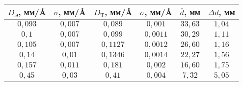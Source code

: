 \begin{tabular}{| c | c | c | c | c | c |}
\hline
$D_{\text{Э}}$, мм/\AA & $\sigma$, мм/\AA & $D_{\text{T}}$, мм/\AA & $\sigma$, мм/\AA & $\overline{d}$, мм & $\Delta d$, мм\\
\hline
$0,093$ & $0,007$ & $0,089$ & $0,001$ & $33,63$ & $1,04$\\
\hline
$0,1$ & $0,007$ & $0,099$ & $0,0011$ & $30,29$ & $1,11$\\
\hline
$0,105$ & $0,007$ & $0,1127$ & $0,0012$ & $26,60$ & $1,16$\\
\hline
$0,14$ & $0,01$ & $0,1346$ & $0,0014$ & $22,27$ & $1,56$\\
\hline
$0,157$ & $0,011$ & $0,181$ & $0,002$ & $16,60$ & $1,75$\\
\hline
$0,45$ & $0,03$ & $0,41$ & $0,004$ & $7,32$ & $5,05$\\
\hline
\end{tabular}
